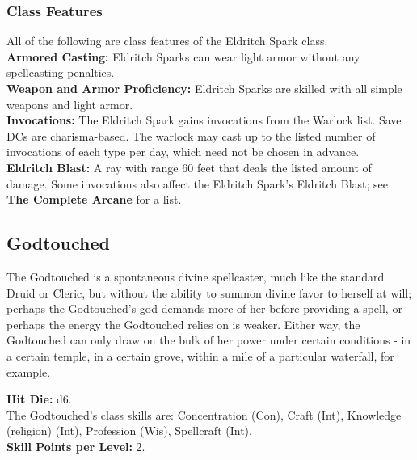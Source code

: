 \documentclass[11pt]{report}
\begin{document}
\subsubsection{Class Features}
All of the following are class features of the Eldritch Spark class. \\
\textbf{Armored Casting:} Eldritch Sparks can wear light armor without any
spellcasting penalties. \\
\textbf{Weapon and Armor Proficiency:} Eldritch Sparks are skilled with all
simple weapons and light armor. \\
\textbf{Invocations:} The Eldritch Spark gains invocations from the Warlock
list. Save DCs are charisma-based. The warlock may cast up to the listed number
of invocations of each type per day, which need not be chosen in advance. \\
\textbf{Eldritch Blast:} A ray with range 60 feet that deals the listed amount
of damage. Some invocations also affect the Eldritch Spark's Eldritch Blast; see
\textbf{The Complete Arcane} for a list.

\subsection{Godtouched}
The Godtouched is a spontaneous divine spellcaster, much like the standard Druid
or Cleric, but without the ability to summon divine favor to herself at will;
perhaps the Godtouched's god demands more of her before providing a spell, or
perhaps the energy the Godtouched relies on is weaker. Either way, the
Godtouched can only draw on the bulk of her power under certain conditions - in
a certain temple, in a certain grove, within a mile of a particular waterfall,
for example.

\textbf{Hit Die:} d6. \\
The Godtouched's class skills are: Concentration (Con), Craft (Int), Knowledge
(religion) (Int), Profession (Wis), Spellcraft (Int). \\
\textbf{Skill Points per Level:} 2.
\end{document}
